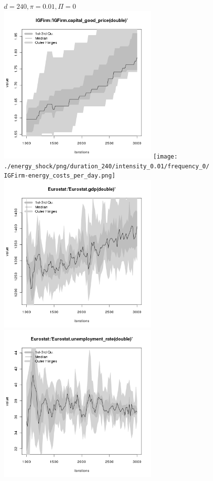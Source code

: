 \begin{figure}[ht!]
\centering\leavevmode
\begin{minipage}{17cm}
\centering\leavevmode
{$d=240, \pi=0.01, \Pi=0$}\\
\includegraphics[width=8cm]{./energy_shock/png/duration_240/intensity_0.01/frequency_0/IGFirm-capital_good_price.png}
\texttt{[image: ./energy\_shock/png/duration\_240/intensity\_0.01/frequency\_0/IGFirm-energy\_costs\_per\_day.png]}
\includegraphics[width=8cm]{./energy_shock/png/duration_240/intensity_0.01/frequency_0/Eurostat-gdp.png}
\includegraphics[width=8cm]{./energy_shock/png/duration_240/intensity_0.01/frequency_0/Eurostat-unemployment_rate.png}
\end{minipage}
\end{figure}


